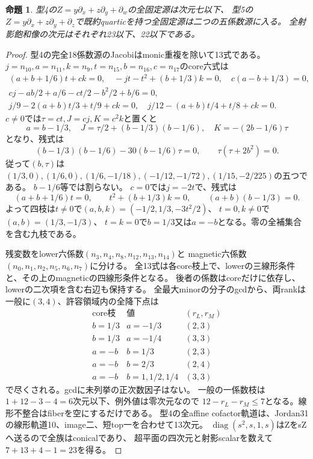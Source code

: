 \documentclass[a4paper,11pt]{ltjsarticle}
\newtheorem{proposition}{命題}[section]
\theoremstyle{definition}
\begin{document}
\begin{proposition}\label{prop:quartic-nil31-bounds}
型4の$Z=y\partial_x+z\partial_y+\partial_w$の全固定源は次元七以下、
型5の$Z=y\partial_x+z\partial_y+\partial_z$で既約quarticを持つ全固定源は二つの五係数源に入る。
全射影飽和像の次元はそれぞれ23以下、22以下である。
\end{proposition}
\begin{proof}
型4の完全18係数源のJacobiはmonic重複を除いて13式である。
$j=n_{10},a=n_{11},k=n_9,t=n_{15},b=n_{16},c=n_{17}$のcore六式は
\[
\begin{gathered}
 (a+b+1/6)t+ck=0,\quad-jt-t^2+(b+1/3)k=0,\quad c(a-b+1/3)=0,\\
 cj-ab/2+a/6-ct/2-b^2/2+b/6=0,\\
 j/9-2(a+b)t/3+t/9+ck=0,\quad
 j/12-(a+b)t/4+t/8+ck=0.
\end{gathered}
\]
$c\ne0$では$\tau=ct,J=cj,K=c^2k$と置くと
\[
 a=b-1/3,\quad J=\tau/2+(b-1/3)(b-1/6),\quad K=-(2b-1/6)\tau
\]
となり、残式は
\[
 (b-1/3)(b-1/6)-30(b-1/6)\tau=0,\qquad \tau(\tau+2b^2)=0.
\]
従って$(b,\tau)$は
$(1/3,0),(1/6,0),(1/6,-1/18),(-1/12,-1/72),(1/15,-2/225)$の五つである。
$b-1/6$等では割らない。
$c=0$では$j=-2t$で、残式は
\[
 (a+b+1/6)t=0,\qquad t^2+(b+1/3)k=0,\qquad(a+b)(b-1/3)=0.
\]
よって四枝は$t\ne0$で$(a,b,k)=(-1/2,1/3,-3t^2/2)$、
$t=0,k\ne0$で$(a,b)=(1/3,-1/3)$、
$t=k=0$で$b=1/3$又は$a=-b$となる。零の全補集合を含む九枝である。

残変数をlower六係数$(n_3,n_4,n_8,n_{12},n_{13},n_{14})$と
magnetic六係数$(n_0,n_1,n_2,n_5,n_6,n_7)$に分ける。
全13式は各core枝上で、lowerの三線形条件と、その上のmagneticの四線形条件となる。
後者の係数はcoreだけに依存し、lowerの二次項を含む右辺も保持する。
全最大minorの分子のgcdから、両rankは一般に$(3,4)$、許容領域内の全降下点は
\[
\begin{array}{c|c|c}
 \text{core枝}&\text{値}&(r_L,r_M)\\\hline
 b=1/3&a=-1/3&(2,3)\\
 b=1/3&a=-1/4&(3,3)\\
 a=-b&b=1/3&(2,3)\\
 a=-b&b=2/3&(2,4)\\
 a=-b&b=1,1/2,1/4&(3,3)
\end{array}
\]
で尽くされる。gcdに未列挙の正次数因子はない。
一般の一係数枝は$1+12-3-4=6$次元以下、例外値は零次元なので
$12-r_L-r_M\le7$となる。線形不整合はfiberを空にするだけである。
型4の全affine cofactor軌道は、Jordan31の線形軌道10、image二、短top一を合わせて13次元。
$\operatorname{diag}(s^2,s,1,s)$はZをsZへ送るので全族はconicalであり、
超平面の四次元と射影scalarを数えて$7+13+4-1=23$を得る。


\end{proof}
\end{document}
